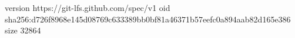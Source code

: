 version https://git-lfs.github.com/spec/v1
oid sha256:d726f8968e145d08769c633389bb0bf81a46371b57eefc0a894aab82d165e386
size 32864
